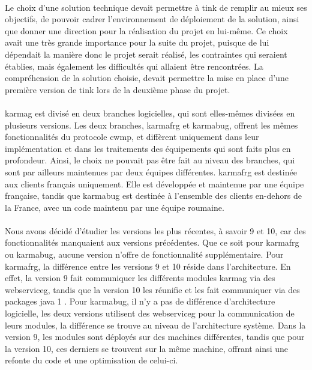 \documentclass[12pt,a4paper]{report}
\begin{document}
\paragraph*{}Le choix d’une solution technique devait permettre à \gls{tink} de remplir au mieux ses objectifs, de pouvoir cadrer l’environnement de déploiement de la solution, ainsi que donner une direction pour la réalisation du projet en lui-même. Ce choix avait une très grande importance pour la suite du projet, puisque de lui dépendait la manière donc le projet serait réalisé, les contraintes qui seraient établies, mais également les difficultés qui allaient être rencontrées. La compréhension de la solution choisie, devait permettre la mise en place d’une première version de \gls{tink} lors de la deuxième phase du projet.
\paragraph*{}\gls{karmag} est divisé en deux branches logicielles, qui sont elles-mêmes divisées en plusieurs versions. Les deux branches, \gls{karmafrg} et \gls{karmabug}, offrent les mêmes fonctionnalités du protocole \gls{cwmp}, et diffèrent uniquement dans leur implémentation et dans les traitements des équipements qui sont faits plus en profondeur. Ainsi, le choix ne pouvait pas être fait au niveau des branches, qui sont par ailleurs maintenues par deux équipes différentes. \gls{karmafrg} est destinée aux clients français uniquement. Elle est développée et maintenue par une équipe française, tandis que \gls{karmabug} est destinée à l’ensemble des clients en-dehors de la France, avec un code maintenu par une équipe roumaine.
\paragraph*{}Nous avons décidé d’étudier les versions les plus récentes, à savoir 9 et
10, car des fonctionnalités manquaient aux versions précédentes. Que ce soit pour \gls{karmafrg} ou \gls{karmabug}, aucune version n’offre de fonctionnalité supplémentaire. Pour \gls{karmafrg}, la différence entre les versions 9 et 10 réside dans l’architecture. En effet, la version 9 fait communiquer les différents modules \gls{karmag} via des \gls{webserviceg}, tandis que la version 10 les réunifie et les fait communiquer via des packages java 1 . Pour \gls{karmabug}, il n’y a pas de différence d’architecture logicielle, les deux versions utilisent des \gls{webserviceg} pour la communication de leurs modules, la différence se trouve au niveau de l’architecture système. Dans la version 9, les modules sont déployés sur des machines différentes, tandis que pour la version 10, ces derniers se trouvent sur la même machine, offrant ainsi une refonte du code et une optimisation de celui-ci.
\end{document}
